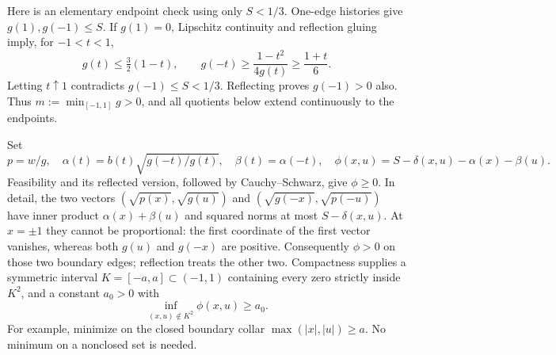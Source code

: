 Here is an elementary endpoint check using only $S<1/3$.
One-edge histories give $g(1),g(-1)\le S$. If $g(1)=0$, Lipschitz
continuity and reflection gluing imply, for $-1<t<1$,
\[
 g(t)\le\tfrac32(1-t),\qquad
 g(-t)\ge\frac{1-t^2}{4g(t)}\ge\frac{1+t}{6}.
\]
Letting $t\uparrow1$ contradicts $g(-1)\le S<1/3$. Reflecting proves
$g(-1)>0$ also. Thus $m:=\min_{[-1,1]}g>0$, and all quotients below
extend continuously to the endpoints.

Set
\[
 p=w/g,\quad \alpha(t)=b(t)\sqrt{g(-t)/g(t)},\quad
 \beta(t)=\alpha(-t),\quad
 \phi(x,u)=S-\delta(x,u)-\alpha(x)-\beta(u).
\]
Feasibility and its reflected version, followed by Cauchy--Schwarz, give
$\phi\ge0$. In detail, the two vectors
$(\sqrt{p(x)},\sqrt{g(u)})$ and
$(\sqrt{g(-x)},\sqrt{p(-u)})$ have inner product
$\alpha(x)+\beta(u)$ and squared norms at most $S-\delta(x,u)$.
At $x=\pm1$ they cannot be proportional: the first coordinate of the
first vector vanishes, whereas both $g(u)$ and $g(-x)$ are positive.
Consequently $\phi>0$ on those two boundary edges; reflection treats the
other two. Compactness supplies a symmetric interval
$K=[-a,a]\subset(-1,1)$ containing every zero strictly inside $K^2$,
and a constant $a_0>0$ with
\begin{equation}\label{eq:wf-collar}
 \inf_{(x,u)\notin K^2}\phi(x,u)\ge a_0.
\end{equation}
For example, minimize on the closed boundary collar
$\max(|x|,|u|)\ge a$. No minimum on a nonclosed set is needed.

